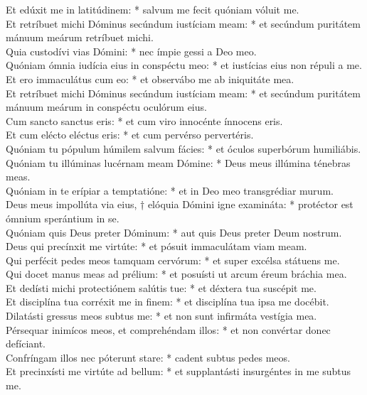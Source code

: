 {	Et edúxit me in latitúdinem: * salvum me fecit quóniam vóluit me. \\
	Et retríbuet michi Dóminus secúndum iustíciam meam: * et secúndum puritátem mánuum meárum retríbuet michi. \\
	Quia custodívi vias Dómini: * nec ímpie gessi a Deo meo. \\
	Quóniam ómnia iudícia eius in conspéctu meo: * et iustícias eius non répuli a me. \\
	Et ero immaculátus cum eo: * et observábo me ab iniquitáte mea. \\
	Et retríbuet michi Dóminus secúndum iustíciam meam: * et secúndum puritátem mánuum meárum in conspéctu oculórum eius. \\
	Cum sancto sanctus eris: * et cum viro innocénte ínnocens eris. \\
	Et cum elécto eléctus eris: * et cum pervérso pervertéris. \\
	Quóniam tu pópulum húmilem salvum fácies: * et óculos superbórum humiliábis. \\
	Quóniam tu illúminas lucérnam meam Dómine: * Deus meus illúmina ténebras meas. \\
	Quóniam in te erípiar a temptatióne: * et in Deo meo transgrédiar murum. \\
	Deus meus impollúta via eius, † elóquia Dómini igne examináta: * protéctor est ómnium sperántium in se. \\
	Quóniam quis Deus preter Dóminum: * aut quis Deus preter Deum nostrum. \\
	Deus qui precínxit me virtúte: * et pósuit immaculátam viam meam. \\
	Qui perfécit pedes meos tamquam cervórum: * et super excélsa státuens me. \\
	Qui docet manus meas ad prélium: * et posuísti ut arcum éreum bráchia mea. \\
	Et dedísti michi protectiónem salútis tue: * et déxtera tua suscépit me. \\
	Et disciplína tua corréxit me in finem: * et disciplína tua ipsa me docébit. \\
	Dilatásti gressus meos subtus me: * et non sunt infirmáta vestígia mea. \\
	Pérsequar inimícos meos, et comprehéndam illos: * et non convértar donec defíciant. \\
	Confríngam illos nec póterunt stare: * cadent subtus pedes meos. \\
	Et precinxísti me virtúte ad bellum: * et supplantásti insurgéntes in me subtus me. \\
}
